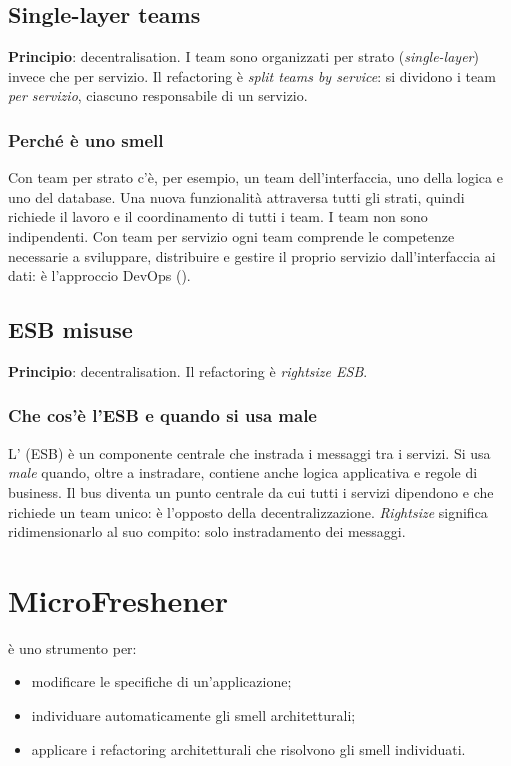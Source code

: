 \subsection{Single-layer teams}

\textbf{Principio}: decentralisation. I team sono organizzati per strato (\emph{single-layer}) invece che per servizio.
Il refactoring è \emph{split teams by service}: si dividono i team \emph{per servizio}, ciascuno responsabile di un
servizio.

\subsubsection{Perché è uno smell\aggiunta}
Con team per strato c'è, per esempio, un team dell'interfaccia, uno della logica e uno del database. Una nuova
funzionalità attraversa tutti gli strati, quindi richiede il lavoro e il coordinamento di tutti i team. I team
non sono indipendenti. Con team per servizio ogni team comprende le competenze necessarie a sviluppare, distribuire e
gestire il proprio servizio dall'interfaccia ai dati: è l'approccio DevOps ().

\subsection{ESB misuse}

\textbf{Principio}: decentralisation. Il refactoring è \emph{rightsize ESB}.

\subsubsection{Che cos'è l'ESB e quando si usa male\aggiunta}
L' (ESB) è un componente centrale che instrada i messaggi tra i servizi. Si usa
\emph{male} quando, oltre a instradare, contiene anche logica applicativa e regole di business. Il bus diventa un
punto centrale da cui tutti i servizi dipendono e che richiede un team unico: è l'opposto della decentralizzazione.
\emph{Rightsize} significa ridimensionarlo al suo compito: solo instradamento dei messaggi.

\section{MicroFreshener}
\label{sec:smell-microfreshener}

 è uno strumento per:
\begin{itemize}
  \item modificare le specifiche di un'applicazione;
  \item individuare automaticamente gli smell architetturali;
  \item applicare i refactoring architetturali che risolvono gli smell individuati.
\end{itemize}

